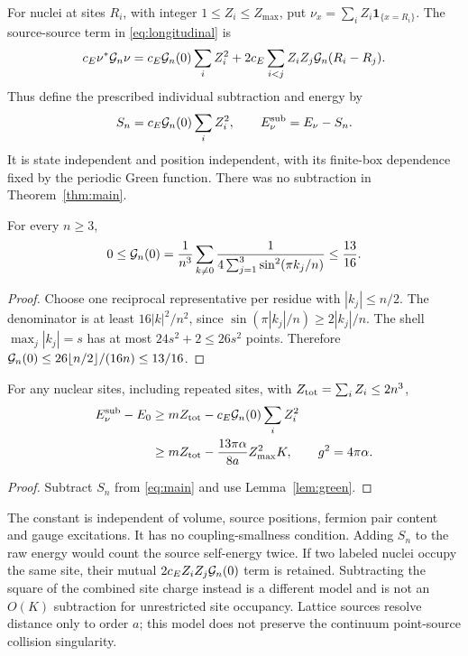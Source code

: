 For nuclei at sites $R_i$, with integer $1\le Z_i\le Z_{\max}$,
put $\nu_x=\sum_iZ_i\mathbf1_{\{x=R_i\}}$.
The source-source term in \eqref{eq:longitudinal} is
\begin{equation}
 c_E\nu^*\mathcal G_n\nu
 =c_E\mathcal G_n(0)\sum_iZ_i^2
   +2c_E\sum_{i<j}Z_iZ_j\mathcal G_n(R_i-R_j).
 \label{eq:source-energy}
\end{equation}
Thus define the prescribed individual subtraction and energy by
\[
 S_n=c_E\mathcal G_n(0)\sum_iZ_i^2,\qquad
 E_\nu^{\rm sub}=E_\nu-S_n.
\]
It is state independent and position independent, with its
finite-box dependence fixed by the periodic Green function.
There was no subtraction in Theorem~\ref{thm:main}.

\begin{lemma}
\label{lem:green}
For every $n\ge3$,
\begin{equation}
 0\le\mathcal G_n(0)=\frac1{n^3}\sum_{k\ne0}
 \frac1{4\sum_{j=1}^3\sin^2(\pi k_j/n)}
 \le\frac{13}{16}.
 \label{eq:green}
\end{equation}
\end{lemma}
\begin{proof}
Choose one reciprocal representative per residue with
$|k_j|\le n/2$. The denominator is at least $16|k|^2/n^2$,
since $\sin(\pi|k_j|/n)\ge2|k_j|/n$.
The shell $\max_j|k_j|=s$ has at most $24s^2+2\le26s^2$
points. Therefore
$\mathcal G_n(0)\le26\lfloor n/2\rfloor/(16n)\le13/16$.
\end{proof}

\begin{corollary}
\label{cor:stability}
For any nuclear sites, including repeated sites, with
$Z_{\rm tot}=\sum_iZ_i\le2n^3$,
\begin{align}
 E_\nu^{\rm sub}-E_0
 &\ge mZ_{\rm tot}-c_E\mathcal G_n(0)\sum_iZ_i^2\nonumber\\
 &\ge mZ_{\rm tot}-\frac{13\pi\alpha}{8a}Z_{\max}^2K,
 \qquad g^2=4\pi\alpha.
 \label{eq:stability}
\end{align}
\end{corollary}
\begin{proof}
Subtract $S_n$ from \eqref{eq:main} and use Lemma~\ref{lem:green}.
\end{proof}

The constant is independent of volume, source positions, fermion
pair content and gauge excitations. It has no coupling-smallness
condition. Adding $S_n$ to the raw energy would count the source
self-energy twice.
If two labeled nuclei occupy the same site, their mutual
$2c_EZ_iZ_j\mathcal G_n(0)$ term is retained. Subtracting the square
of the combined site charge instead is a different model and
is not an $O(K)$ subtraction for unrestricted site occupancy.
Lattice sources resolve distance only to order $a$; this model
does not preserve the continuum point-source collision singularity.


